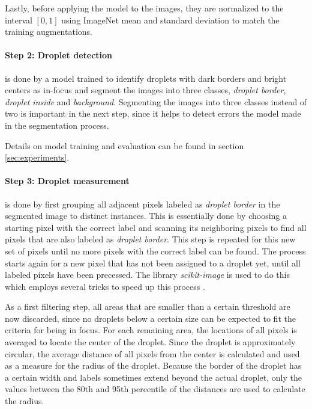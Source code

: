 Lastly, before applying the model to the images, they are normalized to the interval $[0,1]$ using ImageNet mean and standard deviation to match the training augmentations.

\paragraph{Step 2: Droplet detection} is done by a model trained to identify droplets with dark borders and bright centers as in-focus and segment the images into three classes, \emph{droplet border}, \emph{droplet inside} and \emph{background}.
Segmenting the images into three classes instead of two is important in the next step, since it helps to detect errors the model made in the segmentation process.

Details on model training and evaluation can be found in section \ref{sec:experiments}.

\paragraph{Step 3: Droplet measurement} is done by first grouping all adjacent pixels labeled as \emph{droplet border} in the segmented image to distinct instances. 
This is essentially done by choosing a starting pixel with the correct label and scanning its neighboring pixels to find all pixels that are also labeled as \emph{droplet border}.
This step is repeated for this new set of pixels until no more pixels with the correct label can be found.
The process starts again for a new pixel that has not been assigned to a droplet yet, until all labeled pixels have been precessed.
The library \emph{scikit-image}\cite{waltScikitimageImageProcessing2014} is used to do this which employs several tricks to speed up this process \cite{wuOptimizingConnectedComponent2005}. 

As a first filtering step, all areas that are smaller than a certain threshold are now discarded, since no droplets below a certain size can be expected to fit the criteria for being in focus.
For each remaining area, the locations of all pixels is averaged to locate the center of the droplet.
Since the droplet is approximately circular, the average distance of all pixels from the center is calculated and used as a measure for the radius of the droplet.
Because the border of the droplet has a certain width and labels sometimes extend beyond the actual droplet, only the values between the 80th and 95th percentile of the distances are used to calculate the radius.

